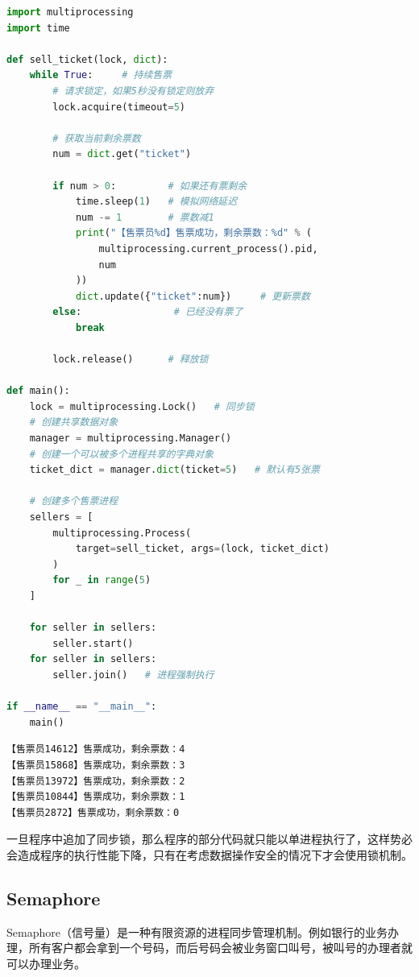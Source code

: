 \begin{lstlisting}[language=Python]
import multiprocessing
import time

def sell_ticket(lock, dict):
	while True:     # 持续售票
		# 请求锁定，如果5秒没有锁定则放弃
		lock.acquire(timeout=5)
		
		# 获取当前剩余票数
		num = dict.get("ticket")
		
		if num > 0:         # 如果还有票剩余
			time.sleep(1)   # 模拟网络延迟
			num -= 1        # 票数减1
			print("【售票员%d】售票成功，剩余票数：%d" % (
				multiprocessing.current_process().pid,
				num
			))
			dict.update({"ticket":num})     # 更新票数
		else:                # 已经没有票了
			break
		
		lock.release()      # 释放锁

def main():
	lock = multiprocessing.Lock()   # 同步锁
	# 创建共享数据对象
	manager = multiprocessing.Manager()
	# 创建一个可以被多个进程共享的字典对象
	ticket_dict = manager.dict(ticket=5)   # 默认有5张票

	# 创建多个售票进程
	sellers = [
		multiprocessing.Process(
			target=sell_ticket, args=(lock, ticket_dict)
		) 
		for _ in range(5)
	]

	for seller in sellers:
		seller.start()
	for seller in sellers:
		seller.join()   # 进程强制执行

if __name__ == "__main__":
	main()
\end{lstlisting}

\begin{tcolorbox}
	\begin{verbatim}
【售票员14612】售票成功，剩余票数：4
【售票员15868】售票成功，剩余票数：3
【售票员13972】售票成功，剩余票数：2
【售票员10844】售票成功，剩余票数：1
【售票员2872】售票成功，剩余票数：0
\end{verbatim}
\end{tcolorbox}

一旦程序中追加了同步锁，那么程序的部分代码就只能以单进程执行了，这样势必会造成程序的执行性能下降，只有在考虑数据操作安全的情况下才会使用锁机制。\\

\subsection{Semaphore}

Semaphore（信号量）是一种有限资源的进程同步管理机制。例如银行的业务办理，所有客户都会拿到一个号码，而后号码会被业务窗口叫号，被叫号的办理者就可以办理业务。\\

